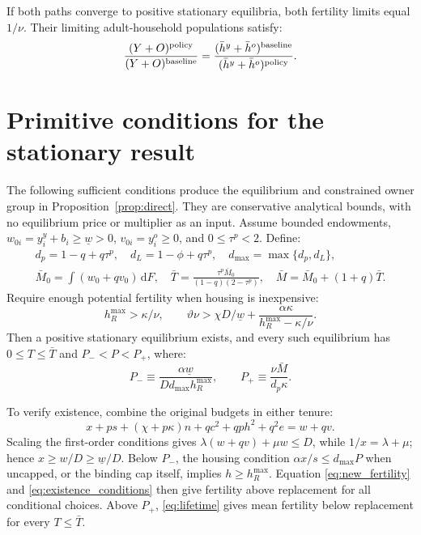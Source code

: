\documentclass[11pt]{article}
\begin{document}
If both paths converge to positive stationary equilibria, both fertility
limits equal $1/\nu$. Their limiting adult-household populations satisfy:
\begin{equation}
\frac{(Y+O)^{\rm policy}}{(Y+O)^{\rm baseline}}
=\frac{(\bar h^y+\bar h^o)^{\rm baseline}}
{(\bar h^y+\bar h^o)^{\rm policy}}.
\label{eq:population_limit}
\end{equation}
\clearpage
\appendix
\section{Primitive conditions for the stationary result}
\label{app:primitives}

The following sufficient conditions produce the equilibrium and constrained
owner group in Proposition~\ref{prop:direct}. They are conservative analytical
bounds, with no equilibrium price or multiplier as an input. Assume bounded
endowments, $w_{0i}=y_i^y+b_i\ge\underline w>0$, $v_{0i}=y_i^o\ge0$, and
$0\le\tau^p<2$. Define:
\begin{equation}
\begin{gathered}
d_p=1-q+q\tau^p,\quad d_L=1-\phi+q\tau^p,\quad
d_{\max}=\max\{d_p,d_L\},\\
\bar M_0=\int(w_0+qv_0)\,\mathrm dF,\quad
\bar T=\frac{\tau^p\bar M_0}{(1-q)(2-\tau^p)},\quad
\bar M=\bar M_0+(1+q)\bar T.
\end{gathered}
\end{equation}
Require enough potential fertility when housing is inexpensive:
\begin{equation}
h_R^{\max}>\kappa/\nu,\qquad
\vartheta\nu>\chi D/\underline w+
\frac{\alpha\kappa}{h_R^{\max}-\kappa/\nu}.
\label{eq:existence_conditions}
\end{equation}
Then a positive stationary equilibrium exists, and every such equilibrium has
$0\le T\le\bar T$ and $P_-<P<P_+$, where:
\begin{equation}
P_-\equiv\frac{\alpha\underline w}{D d_{\max}h_R^{\max}},
\qquad P_+\equiv\frac{\nu\bar M}{d_p\kappa}.
\label{eq:price_bounds}
\end{equation}

To verify existence, combine the original budgets in either tenure:
\begin{equation}
x+ps+(\chi+p\kappa)n+qc^2+qp h^2+q^2e=w+qv.
\label{eq:lifetime}
\end{equation}
Scaling the first-order conditions gives
$\lambda(w+qv)+\mu w\le D$, while $1/x=\lambda+\mu$; hence
$x\ge w/D\ge\underline w/D$. Below $P_-$, the housing condition
$\alpha x/s\le d_{\max}P$ when uncapped, or the binding cap itself,
implies $h\ge h_R^{\max}$. Equation \eqref{eq:new_fertility} and
\eqref{eq:existence_conditions} then give fertility above replacement for
all conditional choices. Above $P_+$, \eqref{eq:lifetime} gives mean
fertility below replacement for every $T\le\bar T$.
\end{document}
